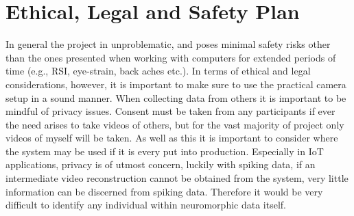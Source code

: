 \chapter{Ethical, Legal and Safety Plan} \label{chap:ethical_plan}

In general the project in unproblematic, and poses minimal safety risks other than the ones presented when working with computers for extended periods of time (e.g., RSI, eye-strain, back aches etc.). In terms of ethical and legal considerations, however, it is important to make sure to use the practical camera setup in a sound manner. When collecting data from others it is important to be mindful of privacy issues. Consent must be taken from any participants if ever the need arises to take videos of others, but for the vast majority of project only videos of myself will be taken. As well as this it is important to consider where the system may be used if it is every put into production. Especially in IoT applications, privacy is of utmost concern, luckily with spiking data, if an intermediate video reconstruction cannot be obtained from the system, very little information can be discerned from spiking data. Therefore it would be very difficult to identify any individual within neuromorphic data itself.